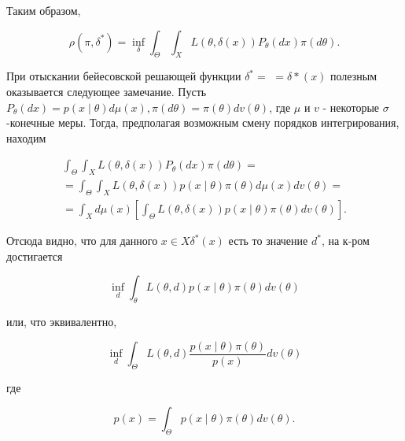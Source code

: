 \documentclass[10pt]{article}
\begin{document}
Таким образом,



\[

\rho\left(\pi, \delta^{*}\right)=\inf _{\delta} \int_{\Theta} \int_{X} L(\theta, \delta(x)) P_{\theta}(d x) \pi(d \theta) .

\]



При отыскании бейесовской решающей функции $\delta^{*}=$ $=\delta *(x)$ полезным оказывается следующее замечание. Пусть $P_{\theta}(d x)=p(x \mid \theta) d \mu(x), \pi(d \theta)=\pi(\theta) d v(\theta)$, где $\mu$ и $v$ - некоторые $\sigma$-конечные меры. Тогда, предполагая возможным смену порядков интегрирования, находим



\[

\begin{gathered}

\int_{\Theta} \int_{X} L(\theta, \delta(x)) P_{\theta}(d x) \pi(d \theta)= \\

=\int_{\Theta} \int_{X} L(\theta, \delta(x)) p(x \mid \theta) \pi(\theta) d \mu(x) d v(\theta)= \\

=\int_{X} d \mu(x)\left[\int_{\Theta} L(\theta, \delta(x)) p(x \mid \theta) \pi(\theta) d v(\theta)\right] .

\end{gathered}

\]



Отсюда видно, что для данного $x \in X \delta^{*}(x)$ есть то значение $d^{*}$, на к-ром достигается



\[

\inf _{d} \int_{\theta} L(\theta, d) p(x \mid \theta) \pi(\theta) d v(\theta)

\]



или, что эквивалентно,



\[

\inf _{d} \int_{\Theta} L(\theta, d) \frac{p(x \mid \theta) \pi(\theta)}{p(x)} d v(\theta)

\]



где



\[

p(x)=\int_{\Theta} p(x \mid \theta) \pi(\theta) d v(\theta) .

\]
\end{document}
